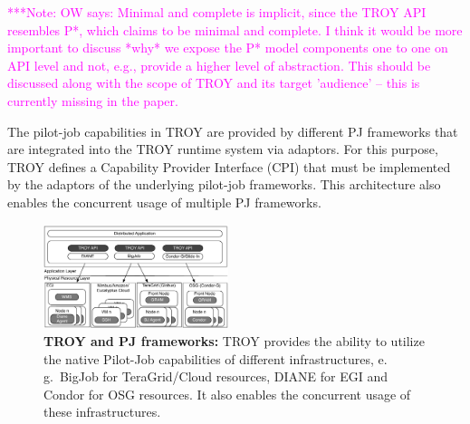 \documentclass[conference,final]{IEEEtran}
\newcommand{\note}[1]{ {\textcolor{magenta} { ***Note: #1 }}}
\newcommand{\note}[1]{}
\newcommand{\upp}{\vspace*{-0.5em}}
\begin{document}
\note{OW says: Minimal and complete is implicit, since the TROY API
resembles P*, which claims to be minimal and complete. I think it would 
be more important to discuss *why* we expose the P* model components one to one
on API level and not, e.g., provide a higher level of abstraction.
This should be discussed along with the scope of TROY and its
target 'audience' -- this is currently missing in the paper.}

The pilot-job capabilities in TROY are provided by different PJ
frameworks that are integrated into the TROY runtime system via
adaptors. For this purpose, TROY defines a Capability Provider
Interface (CPI) that must be implemented by the adaptors of the
underlying pilot-job frameworks. This architecture also enables the
concurrent usage of multiple PJ frameworks.

\begin{figure}[t]
    \centering
\upp
    \includegraphics[width=0.48\textwidth]{figures/distributed_pilot_job.pdf}
    \caption{\textbf{TROY and PJ frameworks:} TROY provides the
      ability to utilize the native Pilot-Job capabilities of
      different infrastructures, e.\,g.\ BigJob for TeraGrid/Cloud
      resources, DIANE for EGI and Condor for OSG resources. It also
      enables the concurrent usage of these infrastructures.
	\upp\upp\upp}
    \label{fig:figures_distributed_pilot_job}
\end{figure}

\end{document}
